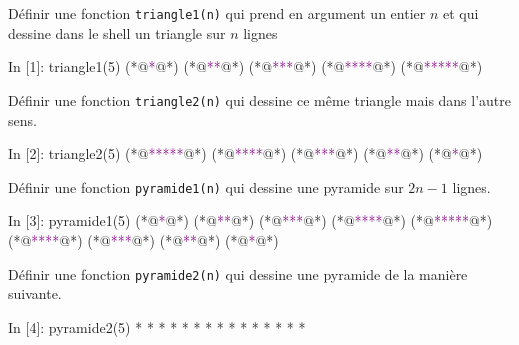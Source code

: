 \documentclass{magnoliaold}
\begin{document}
\begin{questions}
\question Définir une fonction \verb!triangle1(n)! qui prend en argument un entier $n$
  et qui dessine dans le shell un triangle sur $n$ lignes
\begin{pythoncode}
In [1]: triangle1(5)
(*@\textcolor{purple}{*}@*)
(*@\textcolor{purple}{**}@*)
(*@\textcolor{purple}{***}@*)
(*@\textcolor{purple}{****}@*)
(*@\textcolor{purple}{*****}@*)
\end{pythoncode}
\question Définir une fonction \verb!triangle2(n)! qui dessine ce même triangle mais dans
  l'autre sens.
\begin{pythoncode}
In [2]: triangle2(5)
(*@\textcolor{purple}{*****}@*)
(*@\textcolor{purple}{****}@*)
(*@\textcolor{purple}{***}@*)
(*@\textcolor{purple}{**}@*)
(*@\textcolor{purple}{*}@*)
\end{pythoncode}
\question Définir une fonction \verb!pyramide1(n)! qui dessine une pyramide sur $2n-1$ lignes.
\begin{pythoncode}
In [3]: pyramide1(5)
(*@\textcolor{purple}{*}@*)
(*@\textcolor{purple}{**}@*)
(*@\textcolor{purple}{***}@*)
(*@\textcolor{purple}{****}@*)
(*@\textcolor{purple}{*****}@*)
(*@\textcolor{purple}{****}@*)
(*@\textcolor{purple}{***}@*)
(*@\textcolor{purple}{**}@*)
(*@\textcolor{purple}{*}@*)
\end{pythoncode}
\question Définir une fonction \verb!pyramide2(n)! qui dessine une pyramide de la manière
  suivante.
\begin{pythoncode}
In [4]: pyramide2(5)
    *
   * *
  * * *
 * * * *
* * * * *
\end{pythoncode}
\end{questions}

\end{document}
